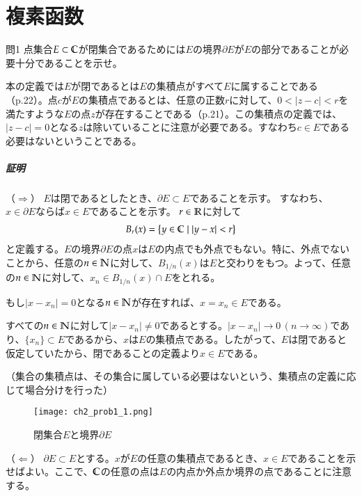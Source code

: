 \chapter{複素函数}%

\begin{mysimplebox}{問1}
    点集合$E\subset\mathbb{C}$が閉集合であるためには$E$の境界$\partial E$が$E$の部分であることが必要十分であることを示せ。 
\end{mysimplebox}

本の定義では$E$が閉であるとは$E$の集積点がすべて$E$に属することである（p.22）。点$c$が$E$の集積点であるとは、任意の正数$r$に対して、$0<|z-c|<r$を満たすような$E$の点$z$が存在することである（p.21）。この集積点の定義では、$|z-c|=0$となる$z$は除いていることに注意が必要である。すなわち$c\in E$である必要はないということである。

\paragraph{証明}
（$\Rightarrow$）
$E$は閉であるとしたとき、$\partial E\subset E$であることを示す。
すなわち、$x\in\partial E$ならば$x\in E$であることを示す。
$r\in\mathbb{R}$に対して
\begin{align*}
    B_r(x)=\left\{y\in\mathbb{C}\mid|y-x|<r\right\}
\end{align*}
と定義する。$E$の境界$\partial E$の点$x$は$E$の内点でも外点でもない。特に、外点でないことから、任意の$n\in \mathbb{N}$に対して、$B_{1/n}(x)$は$E$と交わりをもつ。よって、任意の$n\in \mathbb{N}$に対して、$x_n\in B_{1/n}(x)\cap E$をとれる。

もし$|x-x_n|=0$となる$n\in\mathbb{N}$が存在すれば、$x=x_n\in E$である。

すべての$n\in\mathbb{N}$に対して$|x-x_n|\neq 0$であるとする。$|x-x_n|\longrightarrow 0\, (n\longrightarrow \infty)$であり、$\{x_n\}\subset E$であるから、$x$は$E$の集積点である。したがって、$E$は閉であると仮定していたから、閉であることの定義より$x\in E$である。

（集合の集積点は、その集合に属している必要はないという、集積点の定義に応じて場合分けを行った）

\begin{figure}
    \centering
    \texttt{[image: ch2\_prob1\_1.png]}
    \caption{閉集合$E$と境界$\partial E$}
    \label{ch2_prob1_1}
\end{figure}%

（$\Leftarrow$）
$\partial E\subset E$とする。$x$が$E$の任意の集積点であるとき、$x\in E$であることを示せばよい。ここで、$\mathbb{C}$の任意の点は$E$の内点か外点か境界の点であることに注意する。

